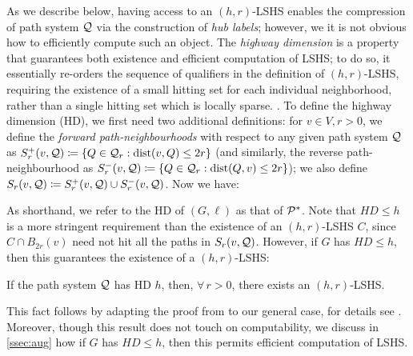 As we describe below, having access to an $(h,r)$-LSHS enables the compression of path system $\calQ$ via the construction of \emph{hub labels}; however, we it is not obvious how to efficiently compute such an object. 
The \emph{highway dimension} is a property that guarantees both existence and efficient computation of LSHS; to do so, it essentially re-orders the sequence of qualifiers in the definition of $(h,r)$-LSHS, requiring the existence of a small hitting set for each individual neighborhood, rather than a single hitting set which is locally sparse. .
To define the highway dimension (HD), we first need two additional definitions:
for $v\in V, r>0$, we define the \emph{forward path-neighbourhoods} with respect to any given path system $\calQ$ as $
S_r^+(v,\calQ) \defeq\crl*{Q\in\calQ_r: \dist(v,Q)\leq 2r}$ (and similarly, the reverse path-neighbourhood as $S_r^-(v,\calQ) \defeq\crl*{Q\in\calQ_r: \dist(Q,v)\leq 2r}$); we also define $S_r(v,\calQ) \defeq S_r^+(v,\calQ)\cup S_r^-(v,\calQ)$. Now we have:

As shorthand, we refer to the HD of $(G,\ell)$ as that of $\PS$. 
Note that $HD\leq h$ is a more stringent requirement than the existence of an $(h,r)$-LSHS $C$, since $C\cap B_{2r}(v)$ need not hit all the paths in $S_r(v,\calQ)$. 
However, if $G$ has $HD \leq h$, then this guarantees the existence of a $(h,r)$-LSHS:
\begin{proposition}\label{prop:equiv}
	If the path system $\calQ$ has HD $h$, then, $\forall\,r>0$, there exists an $(h,r)$-LSHS.
\end{proposition}

This fact follows by adapting the proof from \cite[Theorem 4.2]{highway2013} to our general case, for details see \cite{TechReport}.
Moreover, though this result does not touch on computability, we discuss in \cref{ssec:aug} how if $G$ has $HD \leq h$, then this permits efficient computation of LSHS.


